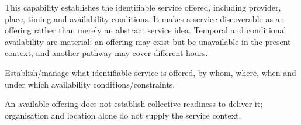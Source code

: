 This capability establishes the identifiable service offered, including provider, place, timing and availability conditions. It makes a service discoverable as an offering rather than merely an abstract service idea. Temporal and conditional availability are material: an offering may exist but be unavailable in the present context, and another pathway may cover different hours.



Establish/\allowbreak{}manage what identifiable service is offered, by whom, where, when and under which availability conditions/\allowbreak{}constraints.



An available offering does not establish collective readiness to deliver it; organisation and location alone do not supply the service context.


